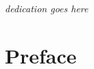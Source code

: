 
\vspace*{23ex}

\centerline{\textit{dedication goes here}}

\chapter*{Preface}
\label{cha:preface}


